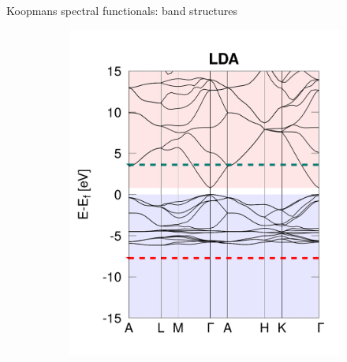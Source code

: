 \documentclass[xcolor=table,aspectratio=169]{beamer}
\numberwithin{equation}{section}
\begin{document}
\begin{frame}{\normalsize Koopmans spectral functionals: band structures}
   \begin{figure}[t]
      \centering
      \begin{subfigure}{0.3\textwidth}
         \includegraphics[width=\columnwidth]{figures/ZnO_lda.png}
      \end{subfigure}
      \begin{subfigure}{0.3\textwidth}

\end{subfigure}
\end{figure}
\end{frame}
\end{document}
